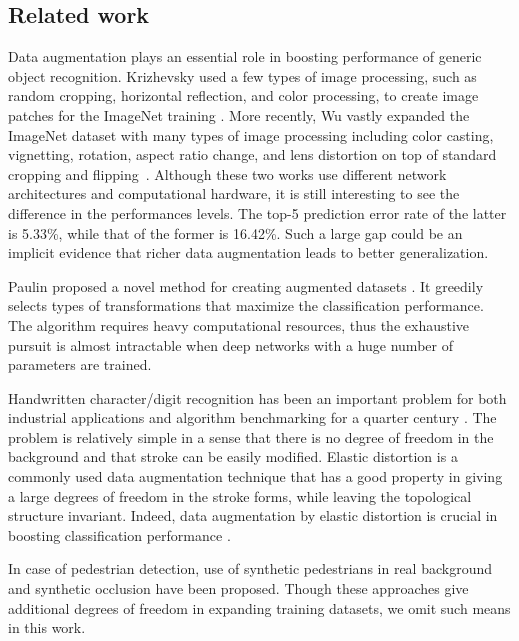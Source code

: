 \documentclass[10pt,twocolumn,letterpaper]{article}
\begin{document}
\subsection{Related work}

Data augmentation plays an essential role in boosting performance of generic object recognition.
Krizhevsky \etal used a few types of image processing, 
such as random cropping, horizontal reflection, and color processing, 
to create image patches for the ImageNet training \cite{NIPS2012_4824}.
More recently, Wu \etal vastly expanded the ImageNet dataset with many types of image processing 
including color casting, vignetting, rotation, aspect ratio change, and lens distortion on top of 
standard cropping and flipping~\cite{2015arXiv150102876W}.
Although these two works use different network architectures and computational hardware,
it is still interesting to see the difference in the performances levels.
The top-5 prediction error rate of the latter is 5.33\%, while that of the former is 16.42\%.
Such a large gap could be an implicit evidence that
richer data augmentation leads to better generalization.

Paulin \etal proposed a novel method for creating augmented datasets \cite{paulin:hal-00979464}.
It greedily selects types of transformations that maximize the classification performance.
The algorithm requires heavy computational resources, thus the exhaustive pursuit is almost intractable 
when deep networks with a huge number of parameters are trained.

Handwritten character/digit recognition has been an important problem for both industrial applications and 
algorithm benchmarking for a quarter century
\cite{conf/nips/YaegerLW96, lecun-98h, Simard03j.c.:best, lecun-89e, Ciresan:2010, Ciresan:2012b}.
The problem is relatively simple in a sense that there is no degree of freedom in the background
and that stroke can be easily modified.
Elastic distortion is a commonly used data augmentation technique that has a good property in 
giving a large degrees of freedom in the stroke forms, 
while leaving the topological structure invariant.
Indeed, data augmentation by elastic distortion is crucial in boosting classification performance
\cite{Simard03j.c.:best, Ciresan:2010, Ciresan:2012b}.

In case of pedestrian detection, use of synthetic pedestrians in real background \cite{6977491} 
and synthetic occlusion \cite{6728373} have been proposed.
Though these approaches give additional degrees of freedom in expanding training datasets,
we omit such means in this work.
\end{document}
